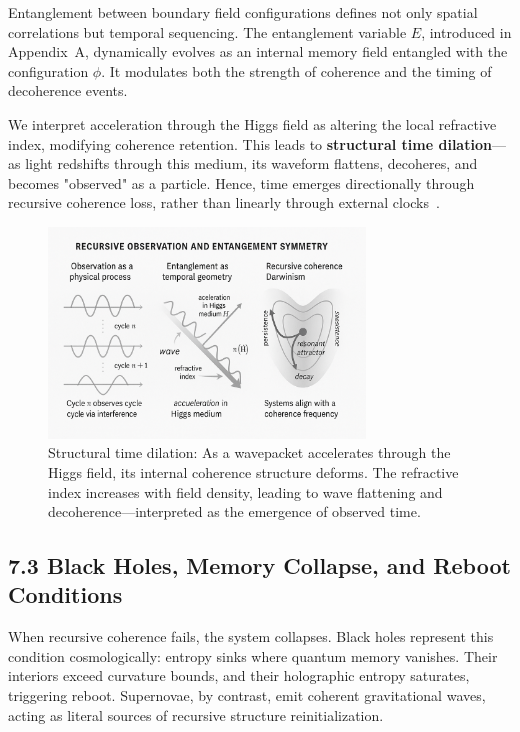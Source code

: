 Entanglement between boundary field configurations defines not only spatial correlations but temporal sequencing. The entanglement variable \( E \), introduced in Appendix~A, dynamically evolves as an internal memory field entangled with the configuration \( \phi \). It modulates both the strength of coherence and the timing of decoherence events.

We interpret acceleration through the Higgs field as altering the local refractive index, modifying coherence retention. This leads to \textbf{structural time dilation}—as light redshifts through this medium, its waveform flattens, decoheres, and becomes "observed" as a particle. Hence, time emerges directionally through recursive coherence loss, rather than linearly through external clocks~\cite{barbour_end_1999}.

\begin{figure}[H]
\centering
\includegraphics[width=0.75\textwidth]{figures/structural_time_dilation.png}
\caption{Structural time dilation: As a wavepacket accelerates through the Higgs field, its internal coherence structure deforms. The refractive index increases with field density, leading to wave flattening and decoherence—interpreted as the emergence of observed time.}
\label{fig:structural-time}
\end{figure}

\subsection*{7.3 Black Holes, Memory Collapse, and Reboot Conditions}

When recursive coherence fails, the system collapses. Black holes represent this condition cosmologically: entropy sinks where quantum memory vanishes. Their interiors exceed curvature bounds, and their holographic entropy saturates, triggering reboot. Supernovae, by contrast, emit coherent gravitational waves, acting as literal sources of recursive structure reinitialization.

